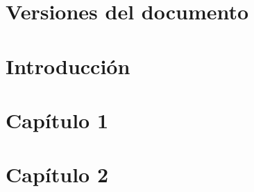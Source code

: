 \documentclass{article}
\author{%
	\textbf{Autor}\\    
    Daniel E. Hanke \\
   empresa \\
    \texttt{daniel@outmacion.com}\vspace{20pt} \\
	\textbf{Supervisor}\\    
    Jose pepe \\
    empresa \\
    \texttt{pepe@pepe.com}
    }
\begin{document}


\tableofcontents

\newpage

\section{Versiones del documento}



\newpage



\section{Introducción}



\section{Capítulo 1}



\section{Capítulo 2}


\end{document}
